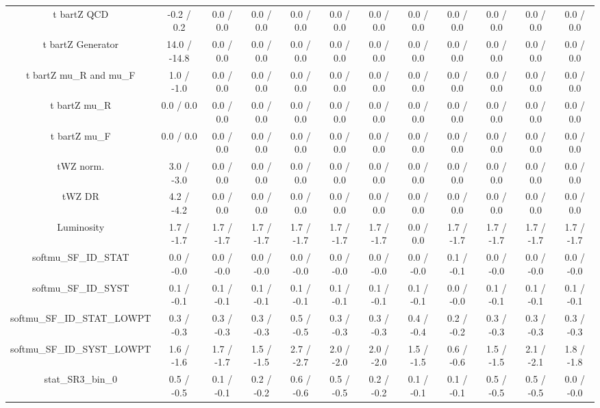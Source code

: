 \begin{table}[htbp]
\begin{center}
\begin{tabular}{|c|c|c|c|c|c|c|c|c|c|c|c|}
  t bar{t}Z QCD & -0.2 / 0.2 & 0.0 / 0.0 & 0.0 / 0.0 & 0.0 / 0.0 & 0.0 / 0.0 & 0.0 / 0.0 & 0.0 / 0.0 & 0.0 / 0.0 & 0.0 / 0.0 & 0.0 / 0.0 & 0.0 / 0.0 \\ 
  t bar{t}Z Generator & 14.0 / -14.8 & 0.0 / 0.0 & 0.0 / 0.0 & 0.0 / 0.0 & 0.0 / 0.0 & 0.0 / 0.0 & 0.0 / 0.0 & 0.0 / 0.0 & 0.0 / 0.0 & 0.0 / 0.0 & 0.0 / 0.0 \\ 
  t bar{t}Z  mu_{R} and  mu_{F} & 1.0 / -1.0 & 0.0 / 0.0 & 0.0 / 0.0 & 0.0 / 0.0 & 0.0 / 0.0 & 0.0 / 0.0 & 0.0 / 0.0 & 0.0 / 0.0 & 0.0 / 0.0 & 0.0 / 0.0 & 0.0 / 0.0 \\ 
  t bar{t}Z  mu_{R} & 0.0 / 0.0 & 0.0 / 0.0 & 0.0 / 0.0 & 0.0 / 0.0 & 0.0 / 0.0 & 0.0 / 0.0 & 0.0 / 0.0 & 0.0 / 0.0 & 0.0 / 0.0 & 0.0 / 0.0 & 0.0 / 0.0 \\ 
  t bar{t}Z  mu_{F} & 0.0 / 0.0 & 0.0 / 0.0 & 0.0 / 0.0 & 0.0 / 0.0 & 0.0 / 0.0 & 0.0 / 0.0 & 0.0 / 0.0 & 0.0 / 0.0 & 0.0 / 0.0 & 0.0 / 0.0 & 0.0 / 0.0 \\ 
  tWZ norm. & 3.0 / -3.0 & 0.0 / 0.0 & 0.0 / 0.0 & 0.0 / 0.0 & 0.0 / 0.0 & 0.0 / 0.0 & 0.0 / 0.0 & 0.0 / 0.0 & 0.0 / 0.0 & 0.0 / 0.0 & 0.0 / 0.0 \\ 
  tWZ DR & 4.2 / -4.2 & 0.0 / 0.0 & 0.0 / 0.0 & 0.0 / 0.0 & 0.0 / 0.0 & 0.0 / 0.0 & 0.0 / 0.0 & 0.0 / 0.0 & 0.0 / 0.0 & 0.0 / 0.0 & 0.0 / 0.0 \\ 
  Luminosity & 1.7 / -1.7 & 1.7 / -1.7 & 1.7 / -1.7 & 1.7 / -1.7 & 1.7 / -1.7 & 1.7 / -1.7 & 0.0 / 0.0 & 1.7 / -1.7 & 1.7 / -1.7 & 1.7 / -1.7 & 1.7 / -1.7 \\ 
  softmu_SF_ID_STAT & 0.0 / -0.0 & 0.0 / -0.0 & 0.0 / -0.0 & 0.0 / -0.0 & 0.0 / -0.0 & 0.0 / -0.0 & 0.0 / -0.0 & 0.1 / -0.1 & 0.0 / -0.0 & 0.0 / -0.0 & 0.0 / -0.0 \\ 
  softmu_SF_ID_SYST & 0.1 / -0.1 & 0.1 / -0.1 & 0.1 / -0.1 & 0.1 / -0.1 & 0.1 / -0.1 & 0.1 / -0.1 & 0.1 / -0.1 & 0.0 / -0.0 & 0.1 / -0.1 & 0.1 / -0.1 & 0.1 / -0.1 \\ 
  softmu_SF_ID_STAT_LOWPT & 0.3 / -0.3 & 0.3 / -0.3 & 0.3 / -0.3 & 0.5 / -0.5 & 0.3 / -0.3 & 0.3 / -0.3 & 0.4 / -0.4 & 0.2 / -0.2 & 0.3 / -0.3 & 0.3 / -0.3 & 0.3 / -0.3 \\ 
  softmu_SF_ID_SYST_LOWPT & 1.6 / -1.6 & 1.7 / -1.7 & 1.5 / -1.5 & 2.7 / -2.7 & 2.0 / -2.0 & 2.0 / -2.0 & 1.5 / -1.5 & 0.6 / -0.6 & 1.5 / -1.5 & 2.1 / -2.1 & 1.8 / -1.8 \\ 
 stat_SR3_bin_0 & 0.5 / -0.5 & 0.1 / -0.1 & 0.2 / -0.2 & 0.6 / -0.6 & 0.5 / -0.5 & 0.2 / -0.2 & 0.1 / -0.1 & 0.1 / -0.1 & 0.5 / -0.5 & 0.5 / -0.5 & 0.0 / -0.0 \\ 

\end{tabular}
\end{center}
\end{table}
